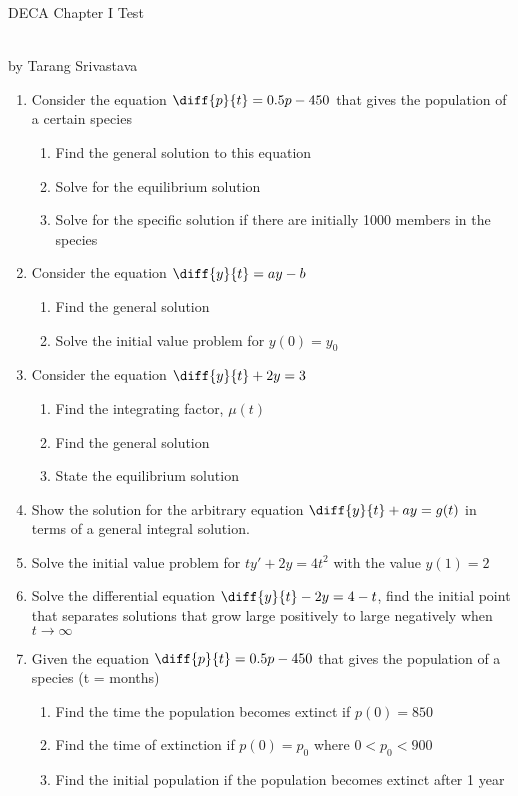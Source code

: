 \documentclass[11pt]{article}
\author{Tarang Srivastava}
\begin{document}
	\begin{multicols*}{2}
		\begin{center}
			\begin{large}
				DECA Chapter I Test
			\end{large}
			\begin{small}
				\\by Tarang Srivastava
			\end{small}

		\end{center}
	\begin{enumerate}
		\item Consider the equation $\diff{p}{t} = 0.5p -450$ that gives the population of a certain species
		\begin{enumerate}
			\item Find the general solution to this equation
			\item Solve for the equilibrium solution 
			\item Solve for the specific solution if there are initially 1000 members in the species
		\end{enumerate}
		\item Consider the equation $\diff{y}{t} = ay - b$
		\begin{enumerate}
			\item Find the general solution
			\item Solve the initial value problem for $y(0) = y_0$
		\end{enumerate}
		\item Consider the equation $\diff{y}{t} + 2y = 3$ 
		\begin{enumerate}
			\item Find the integrating factor, $\mu(t)$ 
			\item Find the general solution 
			\item State the equilibrium solution 
		\end{enumerate}
		\item Show the solution for the arbitrary equation $\diff{y}{t} + ay = g(t)$ in terms of a general integral solution. 
		\item Solve the initial value problem for $ty' + 2y = 4t^2$ with the value $y(1) = 2$ 
		\item Solve the differential equation $\diff{y}{t} - 2y = 4 -t$, find the initial point that separates solutions that grow large positively to large negatively when $t\rightarrow \infty $ 
		\item Given the equation $\diff{p}{t} = 0.5p - 450$ that gives the population of a species (t = months)		\begin{enumerate}
			\item Find the time the population becomes extinct if $p(0) = 850$
			\item Find the time of extinction if $p(0) = p_0$ where $0 < p_0 < 900$
			\item Find the initial population if the population becomes extinct after 1 year 
		\end{enumerate}
	\end{enumerate}
	\end{multicols*}
\end{document}
